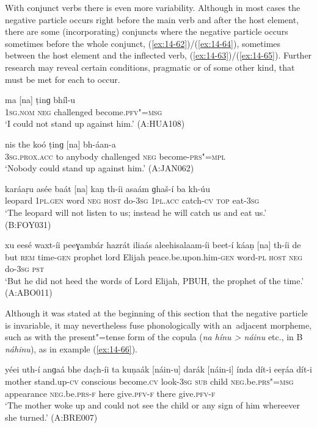 With conjunct verbs there is even more variability. Although in most cases the negative particle occurs right before the main verb and after the host element, there are some (incorporating) conjuncts where the negative particle occurs sometimes before the whole conjunct, (\ref{ex:14-62})/(\ref{ex:14-64}), sometimes between the host element and the inflected verb, (\ref{ex:14-63})/(\ref{ex:14-65}). Further research may reveal certain conditions, pragmatic or of some other kind, that must be met for each to occur. 

\begin{exe}
\ex
\label{ex:14-62}
\gll ma [na] ṭinɡ bhíl-u \\
\textsc{1sg.nom} \textsc{neg} challenged become.\textsc{pfv"=msg } \\
\glt `I could not stand up against him.' (A:HUA108)

\ex
\label{ex:14-63}
\gll nis the koó ṭinɡ [na] bh-áan-a \\
\textsc{3sg.prox.acc} to anybody challenged \textsc{neg} become-\textsc{prs"=mpl } \\
\glt `Nobody could stand up against him.' (A:JAN062)

\ex
\label{ex:14-64}
\gll karáaṛu asée baát [na] kaṇ th-íi asaám ɡhaš-í ba kh-úu \\
leopard \textsc{1pl.gen} word \textsc{neg} \textsc{host} do-\textsc{3sg} \textsc{1pl.acc} catch-\textsc{cv}  \textsc{top} eat-\textsc{3sg} \\
\glt `The leopard will not listen to us; instead he will catch us and eat us.' (B:FOY031)

\ex
\label{ex:14-65}
\gll xu eesé waxt-íi peeɣambár hazrát iliaás aleehisalaam-íi beet-í káaṇ [na] th-íi de \\
but \textsc{rem} time-\textsc{gen} prophet lord  Elijah peace.be.upon.him-\textsc{gen} word-\textsc{pl} \textsc{host} \textsc{neg} do-\textsc{3sg} \textsc{pst} \\
\glt `But he did not heed the words of Lord Elijah, PBUH, the prophet of the time.' (A:ABO011)
\end{exe}

Although it was stated at the beginning of this section that the negative particle is invariable, it may nevertheless fuse phonologically with an~adjacent morpheme, such as with the present"=tense form of the copula (\textit{na hínu {\textgreater} náinu} etc., in B \textit{náhinu}), as in example (\ref{ex:14-66}).

\begin{exe}
\ex
\label{ex:14-66}
\gll yéei uth-í anɡaá bhe dac̣h-íi ta kuṇaák [náin-u] darák [náin-i] índa dít-i eeṛáa dít-i \\
mother stand.up-\textsc{cv} conscious become.\textsc{cv} look-\textsc{3sg}  \textsc{sub} child \textsc{neg.}be.\textsc{prs"=msg} appearance \textsc{neg.}be.\textsc{prs-f}  here give.\textsc{pfv-f} there give.\textsc{pfv-f} \\
\glt `The mother woke up and could not see the child or any sign of him whereever she turned.' (A:BRE007)
\end{exe}

